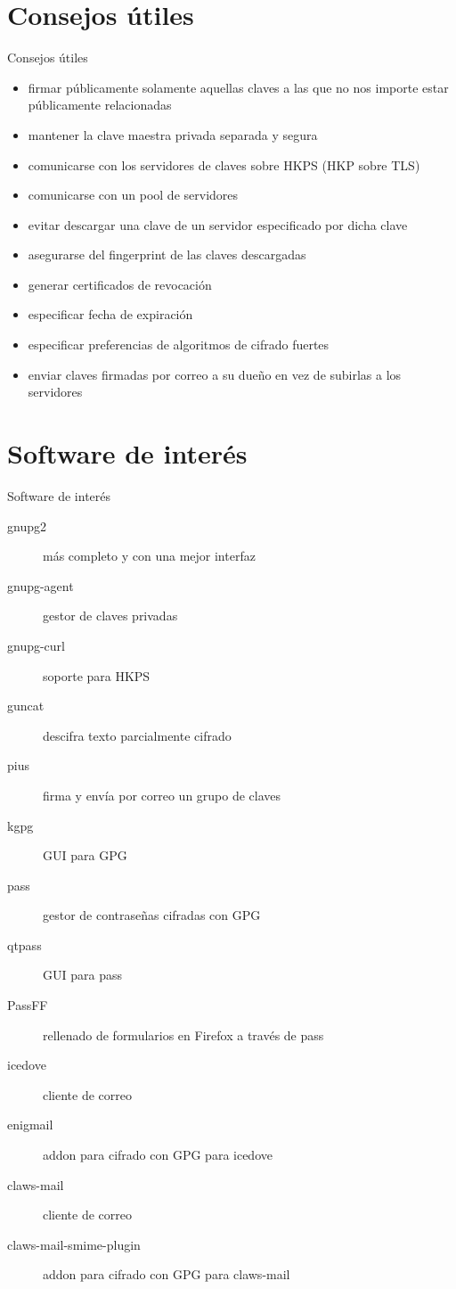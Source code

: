 \documentclass{beamer}
\begin{document}
\section{Consejos útiles}
\begin{frame}[allowframebreaks]{Consejos útiles}
\begin{itemize}
    \item firmar públicamente solamente aquellas claves a las que no nos importe
        estar públicamente relacionadas
    \item mantener la clave maestra privada separada y segura
    \item comunicarse con los servidores de claves sobre HKPS (HKP sobre TLS)
    \item comunicarse con un pool de servidores
    \item evitar descargar una clave de un servidor especificado por dicha clave
        \framebreak
    \item asegurarse del fingerprint de las claves descargadas
    \item generar certificados de revocación
    \item especificar fecha de expiración
    \item especificar preferencias de algoritmos de cifrado fuertes
    \item enviar claves firmadas por correo a su dueño en vez de subirlas a los
        servidores
\end{itemize}
\end{frame}


\section{Software de interés}
\begin{frame}[allowframebreaks]{Software de interés}
\begin{description}
    \item[gnupg2] más completo y con una mejor interfaz
    \item[gnupg-agent] gestor de claves privadas
    \item[gnupg-curl] soporte para HKPS
    \item[guncat] descifra texto parcialmente cifrado
    \item[pius] firma y envía por correo un grupo de claves
    \item[kgpg] GUI para GPG
        \framebreak
    \item[pass] gestor de contraseñas cifradas con GPG
    \item[qtpass] GUI para pass
    \item[PassFF] rellenado de formularios en Firefox a través de pass
        \framebreak
    \item[icedove] cliente de correo
    \item[enigmail] addon para cifrado con GPG para icedove
    \item[claws-mail] cliente de correo
    \item[claws-mail-smime-plugin] addon para cifrado con GPG para claws-mail
\end{description}
\end{frame}
\end{document}
